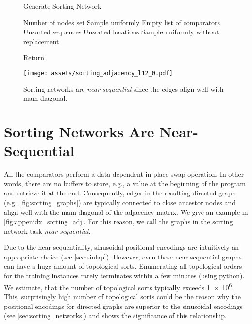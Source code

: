 \documentclass{article}
\begin{document}
\begin{figure}[t]
\centering
\hfill
\begin{minipage}{.6\linewidth}
\centering
\begin{algorithm}[H]
  \caption{Generate Sorting Network}
  \label{algo:appendixsortingnetwork}
  \begin{algorithmic}[1]
     Number of nodes set \STATE Sample uniformly 
    \STATE Empty list of comparators 
    \STATE Unsorted sequences 
    \STATE Unsorted locations 
    \WHILE{}\STATE Sample uniformly  without replacement
        \IF{}
            \STATE 
            \STATE 
            \STATE 
        \ENDIF
    \ENDWHILE

    \STATE Return 
  \end{algorithmic}
\end{algorithm}
\end{minipage}
\hfill
\begin{minipage}{.3\linewidth}
    \centering
    \texttt{[image: assets/sorting\_adjacency\_l12\_0.pdf]}
    \caption{Sorting networks are \emph{near-sequential} since the edges align well with main diagonal.}
    \label{fig:appenidx_sorting_adj}
\end{minipage}
\hfill
\end{figure}

\section{Sorting Networks Are Near-Sequential}\label{sec:appendix_sorting_networks_near_seq}


All the comparators perform a data-dependent in-place swap operation. In other words, there are no buffers to store, e.g., a value at the beginning of the program and retrieve it at the end. Consequently, edges in the resulting directed graph (e.g.\ \autoref{fig:sorting_graphs}) are typically connected to close ancestor nodes and align well with the main diagonal of the adjacency matrix. We give an example in \autoref{fig:appenidx_sorting_adj}. For this reason, we call the graphs in the sorting network task \emph{near-sequential}. 


Due to the near-sequentiality, sinusoidal positional encodings are intuitively an appropriate choice (see \autoref{sec:sinlap}). However, even these near-sequential graphs can have a huge amount of topological sorts. Enumerating all topological orders for the training instances rarely terminates within a few minutes (using python). We estimate, that the number of topological sorts typically exceeds \num{1e6}. This, surprisingly high number of topological sorts could be the reason why the positional encodings for directed graphs are superior to the sinusoidal encodings (see \autoref{sec:sorting_networks}) and shows the significance of this relationship.
\end{document}

